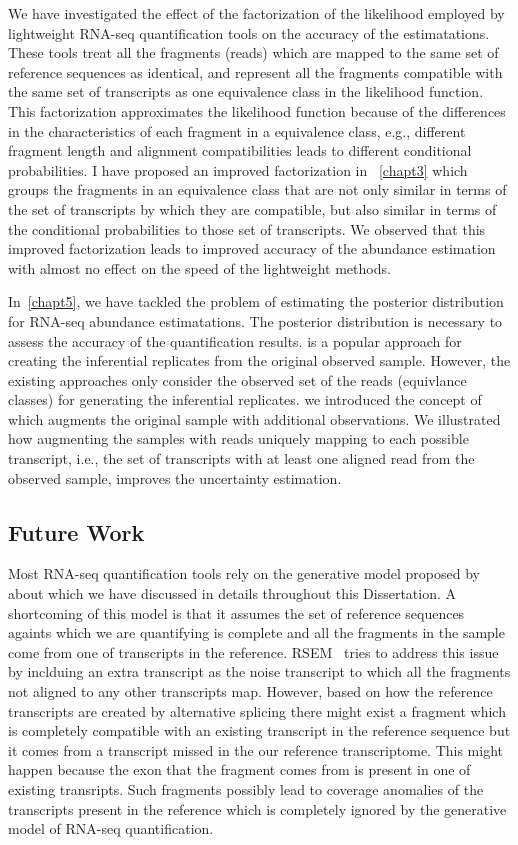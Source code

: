 We have investigated the effect of the factorization of the likelihood employed
by lightweight RNA-seq quantification tools on the accuracy of the estimatations. These tools
treat all the fragments (reads) which are mapped to the same set of reference sequences as identical,
and represent all the fragments compatible with the same set of transcripts as one equivalence
class in the likelihood function. 
This factorization approximates the likelihood function because of the differences in the 
characteristics of each fragment in a equivalence class, e.g., different fragment length
and alignment compatibilities leads to different conditional probabilities.
I have proposed an improved factorization in ~\cref{chapt3} which groups the fragments
in an equivalence class that are not only similar in terms of the set of transcripts by which
they are compatible, but also similar in terms of the conditional probabilities to those
set of transcripts. We observed that this improved factorization leads to improved accuracy of 
the abundance estimation with almost no effect on the speed of the lightweight methods.

In~\cref{chapt5}, we have tackled the problem of estimating the posterior distribution for
RNA-seq abundance estimatations. The posterior distribution is necessary to assess the accuracy
of the quantification results. \boots is a popular approach for creating the inferential replicates
from the original observed sample. However, the existing \boot approaches only consider the observed
set of the reads (equivlance classes) for generating the inferential replicates. we introduced the 
concept of \aboots which augments the original sample with additional observations. We illustrated 
how augmenting the \boot samples with reads uniquely mapping to each possible transcript, i.e., the 
set of transcripts with at least one aligned read from the observed sample, improves the uncertainty
estimation.

\subsection{Future Work}

Most RNA-seq quantification tools rely on the generative model proposed by~\cite{Li2010RSEM} about
which we have discussed in details throughout this Dissertation. A shortcoming of this model is that
it assumes the set of reference sequences againts which we are quantifying is complete and all the 
fragments in the sample come from one of transcripts in the reference. RSEM~\cite{Li2010RSEM} tries to 
address this issue by inclduing an extra transcript as the noise transcript to which all the fragments
not aligned to any other transcripts map. However, based on how the reference transcripts
are created by alternative splicing there might exist a fragment which is completely compatible with
an existing transcript in the reference sequence but it comes from a transcript missed in the our
reference transcriptome. This might happen because the exon that the fragment comes from is present
in one of existing transripts. Such fragments possibly lead to coverage anomalies of the transcripts
present in the reference which is completely ignored by the generative model of RNA-seq quantification.

